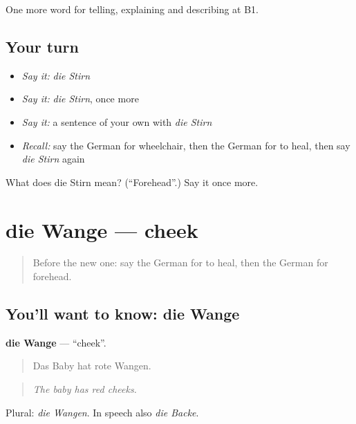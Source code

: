 \begin{grammarlens}[title={What you've built}]
One more word for telling, explaining and describing at B1.
\end{grammarlens}

\subsection*{Your turn}
\begin{itemize}
\raggedright
  \item \emph{Say it:} \emph{die Stirn}
  \item \emph{Say it:} \emph{die Stirn}, once more
  \item \emph{Say it:} a sentence of your own with \emph{die Stirn}
  \item \emph{Recall:} say the German for wheelchair, then the German for to heal, then say \emph{die Stirn} again
\end{itemize}

\begin{tcolorbox}[breakable,colback=teal!4,colframe=teal!35!black,title={Before you move on}]
What does die Stirn mean? (\textquotedblleft{}Forehead\textquotedblright{}.) Say it once more.
\end{tcolorbox}
\section[die Wange]{die Wange — cheek}

\label{lesson:GE-C484-wange}



\begin{quote}
Before the new one: say the German for to heal, then the German for forehead.
\end{quote}

\subsection*{You'll want to know: die Wange}
\textbf{die Wange} — \textquotedblleft{}cheek\textquotedblright{}.

\begin{quote}
Das Baby hat rote Wangen.
\end{quote}

\begin{quote}
\emph{The baby has red cheeks.}
\end{quote}

Plural: \emph{die Wangen}. In speech also \emph{die Backe}.

